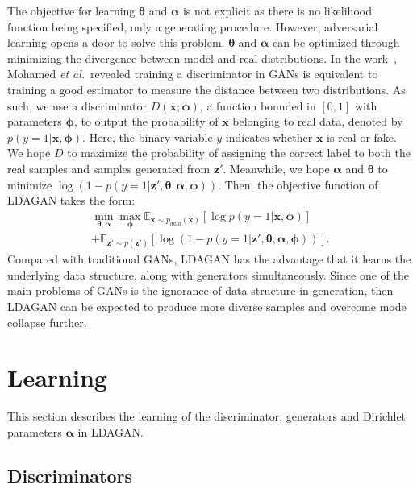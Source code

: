 \documentclass{article}
\def\etal{\emph{et al.}}
\begin{document}
The objective for learning $\bm{\theta}$ and $\bm{\alpha}$ is not explicit as there is no likelihood function being specified, only a generating procedure.
However, adversarial learning opens a door to solve this problem.
$\bm{\theta}$ and $\bm{\alpha}$ can be optimized through minimizing the divergence between model and real distributions.
In the work~\cite{mohamed2017learning}, Mohamed \etal~revealed training a discriminator in GANs is equivalent to training a good estimator to measure the distance between two distributions.
As such, we use a discriminator $D\left(\mathbf{x}; \bm{\phi}\right)$, a function bounded in $\left[0,1\right]$ with parameters $\bm{\phi}$, to output the probability of $\mathbf{x}$ belonging to real data, denoted by $p\left(y=1|\mathbf{x},\bm{\phi}\right)$.
Here, the binary variable $y$ indicates whether $\mathbf{x}$ is real or fake.
We hope $D$ to maximize the probability of assigning the correct label to both the real samples and samples generated from $\mathbf{z}'$.
Meanwhile, we hope $\bm{\alpha}$ and $\bm{\theta}$ to minimize $\log \left( 1-p\left( y=1 | \mathbf{z}',\bm{\theta},\bm{\alpha},\bm{\phi} \right)\right)$.
Then, the objective function of LDAGAN takes the form:
\begin{multline}
\min_{\bm{\theta}, \bm{\alpha}}
\max_{\bm{\phi}}
\mathbb{E}_{\mathbf{x} \sim p_{data}\left(\mathbf{x}\right)}
\left[ \log p\left( y=1 | \mathbf{x}, \bm{\phi} \right) \right]\\
+\mathbb{E}_{\mathbf{z}' \sim p\left(\mathbf{z}'\right)}
\left[ \log \left( 1-p\left( y=1 | \mathbf{z}',\bm{\theta},\bm{\alpha},\bm{\phi} \right)\right) \right].
\label{eq:LDAGAN3}
\end{multline}
\noindent Compared with traditional GANs, LDAGAN has the advantage that it learns the underlying data structure, along with generators simultaneously.
Since one of the main problems of GANs is the ignorance of data structure in generation, then LDAGAN can be expected to produce more diverse samples and overcome mode collapse further.


\section{Learning}
\label{sec:Learning}

This section describes the learning of the discriminator, generators and Dirichlet parameters $\bm{\alpha}$ in LDAGAN.
\subsection{Discriminators}
\label{sec:Discriminator}
\end{document}
